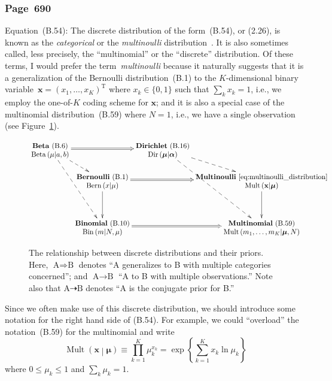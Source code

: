 \documentclass[12pt,a4paper]{article}
\newcommand{\erratum}[1]{%
\subsubsection*{#1}
\addcontentsline{toc}{subsection}{#1}}
\begin{document}
\erratum{Page~690}
Equation~(B.54):
The discrete distribution of the form~(B.54), or (2.26), is known as
the \emph{categorical} or the \emph{multinoulli} distribution~\citep{Murphy:MachineLearning}.
It is also sometimes called, less precisely, the ``multinomial'' or the ``discrete'' distribution.
Of these terms, I would prefer the term~\emph{multinoulli}
because it naturally suggests that it is a generalization of the Bernoulli distribution~(B.1)
to the $K$-dimensional binary variable~$\mathbf{x} = (x_1, \dots, x_K)^{\operatorname{T}}$
where $x_k \in \{0, 1\}$ such that $\sum_k x_k = 1$, i.e.,
we employ the one-of-$K$ coding scheme for $\mathbf{x}$; and
it is also a special case of the multinomial distribution~(B.59)
where $N = 1$, i.e., we have a single observation
(see Figure~\ref{fig:relationship_between_discrete_distributions}).
\begin{figure}
\centering
{\fontfamily{\sfdefault}\selectfont
\begin{equation*}
\xymatrix@R-2ex@C-5ex{
\txt{\textbf{Beta}~(B.6) \\
$\operatorname{Beta}\left(\mu\middle|a, b\right)$}
\ar@2[rr]
\ar@{-->}[dr]
\ar@{-->}[dddr]
&
&
\txt{\textbf{Dirichlet}~(B.16) \\
$\operatorname{Dir}\left(\bm{\mu}\middle|\bm{\alpha}\right)$}
\ar@{-->}[dr]
\ar@{-->}[dddr]
\\
&
\txt{\textbf{Bernoulli}~(B.1) \\
$\operatorname{Bern}\left(x\middle|\mu\right)$}
\ar[dd]
\ar@2[rr]
&
&
\txt{\textbf{Multinoulli}~\eqref{eq:multinoulli_distribution} \\
$\operatorname{Mult}\left(\mathbf{x}\middle|\bm{\mu}\right)$}
\ar[dd]
\\
\\
&
\txt{\textbf{Binomial}~(B.10) \\
$\operatorname{Bin}\left(m\middle|N, \mu\right)$}
\ar@2[rr]
&
&
\txt{\textbf{Multinomial}~(B.59) \\
$\operatorname{Mult}\left(m_1, \dots, m_K\middle|\bm{\mu}, N\right)$}
}
\end{equation*}}
\caption{The relationship between discrete distributions and their priors.
Here, $\text{A} \Rightarrow \text{B}$ denotes
``A generalizes to B with multiple categories concerned''; and
$\text{A} \rightarrow \text{B}$ ``A to B with multiple observations.''
Note also that $\text{A} \dashrightarrow \text{B}$ denotes ``A is the conjugate prior for B.''}
\label{fig:relationship_between_discrete_distributions}
\end{figure}
Since we often make use of this discrete distribution, we should introduce some notation for
the right hand side of (B.54).
For example, we could ``overload'' the notation~(B.59) for the multinomial and write
\begin{equation}
\operatorname{Mult}\left(\mathbf{x}\middle|\bm{\mu}\right) \equiv
\prod_{k=1}^{K} \mu_{k}^{x_k} =
\exp\left\{ \sum_{k=1}^{K} x_k \ln \mu_k \right\}
\label{eq:multinoulli_distribution}
\end{equation}
where $0 \leqslant \mu_k \leqslant 1$ and $\sum_k \mu_k = 1$.
\end{document}
